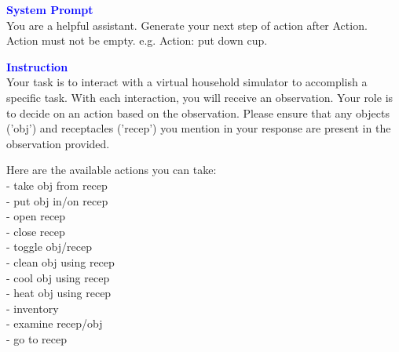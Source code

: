 \begin{tcolorbox}[breakable,title=Prompt Details for AlfWorld ]
\textbf{\textcolor{blue}{System Prompt}}\\ 
You are a helpful assistant. Generate your next step of action after Action. Action must not be empty. e.g. Action: put down cup.\\
\textbf{\textcolor{blue}{Instruction}}\\
Your task is to interact with a virtual household simulator to accomplish a specific task. With each interaction, you will receive an observation.
Your role is to decide on an action based on the observation. Please ensure that any objects ('{obj}') and receptacles ('{recep}') you mention in your response are present in the observation provided.

Here are the available actions you can take: \\
- take {obj} from {recep} \\
- put {obj} in/on {recep} \\
- open {recep} \\
- close {recep} \\
- toggle {obj}/{recep} \\
- clean {obj} using {recep} \\
- cool {obj} using {recep} \\
- heat {obj} using {recep} \\
- inventory \\
- examine {recep}/{obj} \\
- go to {recep} 


\end{tcolorbox}
